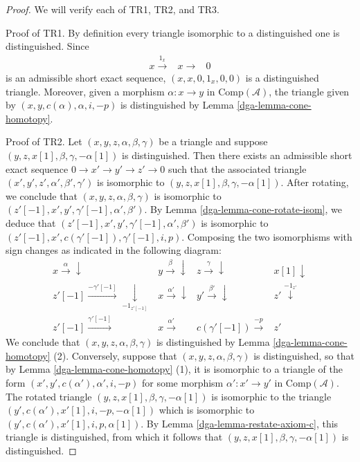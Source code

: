 \begin{proof}

We will verify each of TR1, TR2, and TR3.

\medskip\noindent
Proof of TR1. By definition every triangle isomorphic to a distinguished
one is distinguished. Since
$$
\begin{array}{ccc}x\overset{1_x}{\longrightarrow} & x\longrightarrow & 0\end{array}
$$
is an admissible short exact sequence, $(x, x, 0, 1_x, 0, 0)$
is a distinguished triangle. Moreover, given a morphism
$\alpha : x \to y$ in $\text{Comp}(\mathcal{A})$, the triangle
given by $(x, y, c(\alpha), \alpha, i, -p)$ is distinguished by
Lemma \ref{dga-lemma-cone-homotopy}.

\medskip\noindent
Proof of TR2. Let $(x,y,z,\alpha,\beta,\gamma)$ be a triangle and
suppose $(y,z,x[1],\beta,\gamma,-\alpha[1])$ is distinguished.
Then there exists an admissible short exact sequence
$0 \to x' \to y' \to z' \to 0$ such that the associated triangle
$(x',y',z',\alpha',\beta',\gamma')$ is isomorphic to
$(y,z,x[1],\beta,\gamma,-\alpha[1])$. After rotating, we conclude
that $(x,y,z,\alpha,\beta,\gamma)$ is isomorphic to
$(z'[-1],x',y', \gamma'[-1], \alpha',\beta')$. By
Lemma \ref{dga-lemma-cone-rotate-isom},
we deduce that $(z'[-1],x',y', \gamma'[-1], \alpha',\beta')$ is
isomorphic to $(z'[-1],x',c(\gamma'[-1]), \gamma'[-1], i, p)$.
Composing the two isomorphisms with sign changes as indicated in
the following diagram:
$$
\begin{array}{cccc}x\overset{\alpha}{\longrightarrow}\downarrow & y\overset{\beta}{\longrightarrow}\downarrow & z\overset{\gamma}{\longrightarrow}\downarrow & x[1]\downarrow \\ z'[-1]\overset{-\gamma'[-1]}{\longrightarrow}\underset{-1_{z'[-1]}}{\downarrow} & x \overset{\alpha'}{\longrightarrow}\downarrow & y' \overset{\beta'}{\longrightarrow}\downarrow & z'\overset{-1_{z'}}{\downarrow} \\ z'[-1]\overset{\gamma'[-1]}{\longrightarrow} & x \overset{\alpha'}{\longrightarrow} & c(\gamma'[-1]) \overset{-p}{\longrightarrow} & z'\end{array}
$$
We conclude that $(x,y,z,\alpha,\beta,\gamma)$ is distinguished by
Lemma \ref{dga-lemma-cone-homotopy} (2). Conversely, suppose that
$(x,y,z,\alpha,\beta,\gamma)$ is distinguished, so that by
Lemma \ref{dga-lemma-cone-homotopy} (1), it is isomorphic to a
triangle of the form $(x',y', c(\alpha'), \alpha', i, -p)$
for some morphism $\alpha': x' \to y'$ in $\text{Comp}(\mathcal{A})$.
The rotated triangle $(y,z,x[1],\beta,\gamma, -\alpha[1])$ is
isomorphic to the triangle $(y',c(\alpha'), x'[1], i, -p, -\alpha[1])$
which is isomorphic to $(y',c(\alpha'), x'[1], i, p, \alpha[1])$.
By Lemma \ref{dga-lemma-restate-axiom-c}, this triangle is distinguished,
from which it follows that $(y,z,x[1], \beta,\gamma, -\alpha[1])$
is distinguished.


\end{proof}
